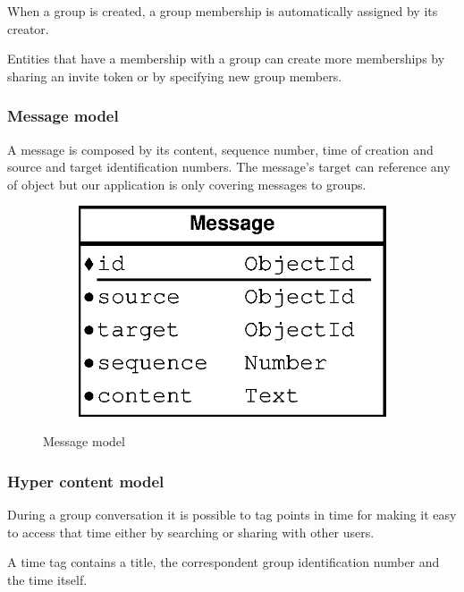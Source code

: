 When a group is created, a group membership is automatically assigned by its creator.

Entities that have a membership with a group can create more memberships by sharing an invite token or by specifying new group members.

\subsubsection{Message model}

A message is composed by its content, sequence number, time of creation and source and target identification numbers. The message's target can reference any of object but our application is only covering messages to groups.

\begin{figure}[H]
    \centering
    \begin{subfigure}[b]{0.3\textwidth}
    	\includegraphics[width=\textwidth]{figures/model_message}
    \end{subfigure}
    \caption{Message model}
\end{figure} 

\subsubsection{Hyper content model}

During a group conversation it is possible to tag points in time for making it easy to access that time either by searching or sharing with other users.

A time tag contains a title, the correspondent group identification number and the time itself.


